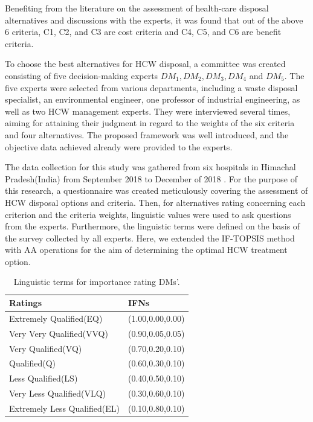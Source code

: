 \begin{flushleft}
\vspace{0.2cm}
\vspace{0.3cm}
\newline
Benefiting from the literature on the assessment of health-care
disposal alternatives and discussions with the experts, it was found that out  of the above 6 criteria, C1, C2, and C3 are cost criteria and C4, C5, and C6 are benefit criteria.

\vspace{3mm}

To choose the best alternatives for HCW disposal, a committee
was created consisting of five decision-making experts $DM_1, DM_2, DM_3, DM_4$
and $DM_5$. The five experts were selected from various departments,
including a waste disposal specialist, an environmental engineer, one
professor of industrial engineering, as well as two HCW management
experts. They were interviewed several times, aiming for
attaining their judgment in regard to the weights of the six criteria
and four alternatives. The proposed
framework was well introduced, and the objective data achieved
already were provided to the experts.

\vspace{3mm}

The data collection for this study was
gathered from six hospitals in Himachal Pradesh(India) from September 2018 to
December of 2018 \cite{7}.
For the purpose of this research, a questionnaire was created
meticulously covering the assessment of HCW disposal options and
criteria. Then, for alternatives rating concerning each criterion and
the criteria weights, linguistic values were used to ask questions
from the experts. Furthermore, the linguistic terms were defined on
the basis of the survey collected by all experts. Here, we extended
the IF-TOPSIS method with AA operations for the aim of determining the optimal HCW
treatment option.

\renewcommand{\arraystretch}{1}
\begin{table}[h!]
    \centering
  
 \caption{Linguistic terms for importance rating DMs’.}
  \begin{tabular}{ p{6cm}|p{3cm}}
 \hline
 
    Ratings & IFNs \\
     \hline
   Extremely Qualified(EQ) & (1.00,0.00,0.00)\\
   Very Very Qualified(VVQ) & (0.90,0.05,0.05) \\
    Very Qualified(VQ) &  (0.70,0.20,0.10) \\
    Qualified(Q) & (0.60,0.30,0.10)\\
    Less Qualified(LS)  & (0.40,0.50,0.10)\\
   Very Less Qualified(VLQ)  &  (0.30,0.60,0.10)\\
    Extremely Less Qualified(EL)  & (0.10,0.80,0.10)  \\
    

\end{tabular}
\end{table}
\end{flushleft}
